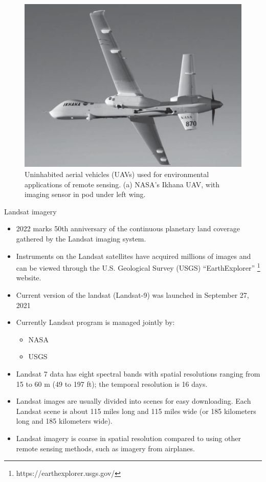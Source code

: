 \documentclass[10pt,dvipsnames,ignorenonframetext,aspectratio=169]{beamer}
\providecommand{\tightlist}{%
  \setlength{\itemsep}{0pt}\setlength{\parskip}{0pt}}
\begin{document}
\begin{frame}{}
\protect\hypertarget{section-4}{}
\begin{figure}
\includegraphics[width=0.65\linewidth]{../images/nasa_remote_sensing_uav} \caption{Uninhabited aerial vehicles (UAVs) used for environmental applications of remote sensing. (a) NASA’s Ikhana UAV, with imaging sensor in pod under left wing.}\label{fig:nasa-uav-remote-sensing}
\end{figure}
\end{frame}

\begin{frame}{Landsat imagery}
\protect\hypertarget{landsat-imagery}{}
\begin{itemize}
\tightlist
\item
  2022 marks 50th anniversary of the continuous planetary land coverage
  gathered by the Landsat imaging system.
\item
  Instruments on the Landsat satellites have acquired millions of images
  and can be viewed through the U.S. Geological Survey (USGS)
  ``EarthExplorer'' \footnote[frame]{https://earthexplorer.usgs.gov/}
  website.
\item
  Current version of the landsat (Landsat-9) was launched in September
  27, 2021
\item
  Currently Landsat program is managed jointly by:

  \begin{itemize}
  \tightlist
  \item
    NASA
  \item
    USGS
  \end{itemize}
\item
  Landsat 7 data has eight spectral bands with spatial resolutions
  ranging from 15 to 60 m (49 to 197 ft); the temporal resolution is 16
  days.
\item
  Landsat images are usually divided into scenes for easy downloading.
  Each Landsat scene is about 115 miles long and 115 miles wide (or 185
  kilometers long and 185 kilometers wide).
\item
  Landsat imagery is coarse in spatial resolution compared to using
  other remote sensing methods, such as imagery from airplanes.
\end{itemize}
\end{frame}
\end{document}
